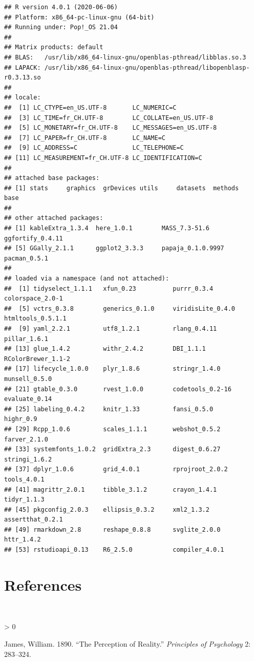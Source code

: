 \documentclass[
  11pt,
]{article}
\newlength{\cslhangindent}
\newenvironment{CSLReferences}[2] %
 {%
  \setlength{\parindent}{0pt}
  \ifodd #1 \everypar{\setlength{\hangindent}{\cslhangindent}}\ignorespaces\fi
  \ifnum #2 > 0
  \setlength{\parskip}{#2\baselineskip}
  \fi
 }%
 {}
\begin{document}
\begin{verbatim}
## R version 4.0.1 (2020-06-06)
## Platform: x86_64-pc-linux-gnu (64-bit)
## Running under: Pop!_OS 21.04
## 
## Matrix products: default
## BLAS:   /usr/lib/x86_64-linux-gnu/openblas-pthread/libblas.so.3
## LAPACK: /usr/lib/x86_64-linux-gnu/openblas-pthread/libopenblasp-r0.3.13.so
## 
## locale:
##  [1] LC_CTYPE=en_US.UTF-8       LC_NUMERIC=C              
##  [3] LC_TIME=fr_CH.UTF-8        LC_COLLATE=en_US.UTF-8    
##  [5] LC_MONETARY=fr_CH.UTF-8    LC_MESSAGES=en_US.UTF-8   
##  [7] LC_PAPER=fr_CH.UTF-8       LC_NAME=C                 
##  [9] LC_ADDRESS=C               LC_TELEPHONE=C            
## [11] LC_MEASUREMENT=fr_CH.UTF-8 LC_IDENTIFICATION=C       
## 
## attached base packages:
## [1] stats     graphics  grDevices utils     datasets  methods   base     
## 
## other attached packages:
## [1] kableExtra_1.3.4  here_1.0.1        MASS_7.3-51.6     ggfortify_0.4.11 
## [5] GGally_2.1.1      ggplot2_3.3.3     papaja_0.1.0.9997 pacman_0.5.1     
## 
## loaded via a namespace (and not attached):
##  [1] tidyselect_1.1.1   xfun_0.23          purrr_0.3.4        colorspace_2.0-1  
##  [5] vctrs_0.3.8        generics_0.1.0     viridisLite_0.4.0  htmltools_0.5.1.1 
##  [9] yaml_2.2.1         utf8_1.2.1         rlang_0.4.11       pillar_1.6.1      
## [13] glue_1.4.2         withr_2.4.2        DBI_1.1.1          RColorBrewer_1.1-2
## [17] lifecycle_1.0.0    plyr_1.8.6         stringr_1.4.0      munsell_0.5.0     
## [21] gtable_0.3.0       rvest_1.0.0        codetools_0.2-16   evaluate_0.14     
## [25] labeling_0.4.2     knitr_1.33         fansi_0.5.0        highr_0.9         
## [29] Rcpp_1.0.6         scales_1.1.1       webshot_0.5.2      farver_2.1.0      
## [33] systemfonts_1.0.2  gridExtra_2.3      digest_0.6.27      stringi_1.6.2     
## [37] dplyr_1.0.6        grid_4.0.1         rprojroot_2.0.2    tools_4.0.1       
## [41] magrittr_2.0.1     tibble_3.1.2       crayon_1.4.1       tidyr_1.1.3       
## [45] pkgconfig_2.0.3    ellipsis_0.3.2     xml2_1.3.2         assertthat_0.2.1  
## [49] rmarkdown_2.8      reshape_0.8.8      svglite_2.0.0      httr_1.4.2        
## [53] rstudioapi_0.13    R6_2.5.0           compiler_4.0.1
\end{verbatim}

\hypertarget{references-1}{%
\section{References}\label{references-1}}

\(~\) \(~\)

\hypertarget{refs}{}
\begin{CSLReferences}{1}{0}
\leavevmode\hypertarget{ref-james_1890}{}%
James, William. 1890. {``The Perception of Reality.''} \emph{Principles
of Psychology} 2: 283--324.

\end{CSLReferences}
\end{document}

